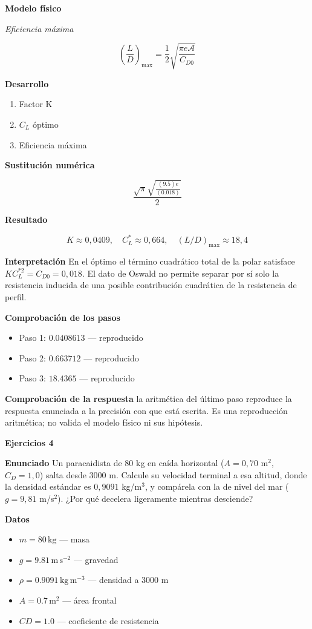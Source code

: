 \documentclass[10pt,openany]{book}
\begin{document}
\noindent\textbf{Modelo físico}

\noindent\textit{Eficiencia máxima}

\[
\left(\frac{L}{D}\right)_{\max} = \frac{1}{2}\sqrt{\frac{\pi e\mathcal{A}}{C_{D0}}}
\]

\noindent\textbf{Desarrollo}
\begin{enumerate}
\item
Factor K
\item
\(C_L\) óptimo
\item
Eficiencia máxima
\end{enumerate}

\noindent\textbf{Sustitución numérica}

\[
\frac{\sqrt{\pi} \sqrt{\frac{\left(9.5\right) e}{\left(0.018\right)}}}{2}
\]

\noindent\textbf{Resultado}

\[
K \approx 0{,}0409,\quad C_L^{*} \approx 0{,}664,\quad (L/D)_{\max} \approx 18{,}4
\]

\noindent\textbf{Interpretación}
En el óptimo el término cuadrático total de la polar satisface \(K C_L^{*2}=C_{D0}=0{,}018\). El dato de Oswald no permite separar por sí solo la resistencia inducida de una posible contribución cuadrática de la resistencia de perfil.

\noindent\textbf{Comprobación de los pasos}
\begin{itemize}
\item Paso 1: $0.0408613$ — reproducido
\item Paso 2: $0.663712$ — reproducido
\item Paso 3: $18.4365$ — reproducido
\end{itemize}

\noindent\textbf{Comprobación de la respuesta} la aritmética del último paso reproduce la respuesta enunciada a la precisión con que está escrita. Es una reproducción aritmética; no valida el modelo físico ni sus hipótesis.

\noindent\textbf{Ejercicios 4}

\noindent\textbf{Enunciado}
Un paracaidista de 80 kg en caída horizontal (\(A = 0{,}70\) m\(^2\), \(C_D = 1{,}0\)) salta desde 3000 m. Calcule su velocidad terminal a esa altitud, donde la densidad estándar es \(0{,}9091\) kg/m\(^3\), y compárela con la de nivel del mar (\(g = 9{,}81\) m/s\(^2\)). ¿Por qué decelera ligeramente mientras desciende?

\noindent\textbf{Datos}
\begin{itemize}
\item $m = 80\,\mathrm{kg}$ — masa
\item $g = 9.81\,\mathrm{m}\,\mathrm{s}^{-2}$ — gravedad
\item $\rho = 0.9091\,\mathrm{kg}\,\mathrm{m}^{-3}$ — densidad a 3000 m
\item $A = 0.7\,\mathrm{m}^{2}$ — área frontal
\item $CD = 1.0$ — coeficiente de resistencia
\end{itemize}
\end{document}
